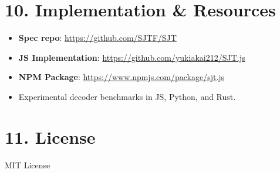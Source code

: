 \documentclass[12pt]{article}
\begin{document}
\section*{10. Implementation \& Resources}

\begin{itemize}
  \item \textbf{Spec repo}: \url{https://github.com/SJTF/SJT}
  \item \textbf{JS Implementation}: \url{https://github.com/yukiakai212/SJT.js}
  \item \textbf{NPM Package}: \url{https://www.npmjs.com/package/sjt.js}
  \item Experimental decoder benchmarks in JS, Python, and Rust.
\end{itemize}

\section*{11. License}

MIT License
\end{document}
